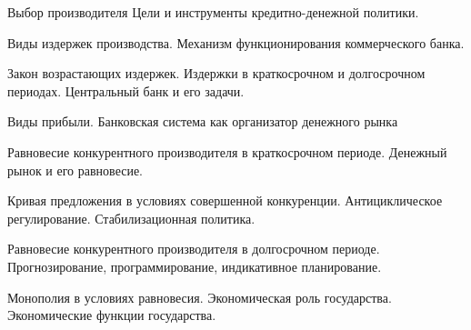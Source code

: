 \z 	Выбор производителя
 \medskip
\z 	Цели и инструменты кредитно-денежной политики.
 \medskip

\newpage


\shapkFull
\setcounter{zad}{0}

\z 	Виды издержек производства.
 \medskip
\z 	Механизм функционирования коммерческого банка.
 \medskip

\newpage


\shapkFull
\setcounter{zad}{0}

\z 	Закон возрастающих издержек.  Издержки в краткосрочном и долгосрочном периодах.
 \medskip
\z 	Центральный банк и его задачи.
 \medskip

\newpage


\shapkFull
\setcounter{zad}{0}

\z 	Виды прибыли.
 \medskip
\z 	Банковская система как организатор денежного рынка
 \medskip

\newpage


\shapkFull
\setcounter{zad}{0}

\z 	Равновесие конкурентного производителя в краткосрочном периоде.
 \medskip
\z 	Денежный рынок и его равновесие.
 \medskip

\newpage


\shapkFull
\setcounter{zad}{0}

\z 	Кривая предложения в условиях совершенной конкуренции.
 \medskip
\z 	Антициклическое регулирование. Стабилизационная политика.
 \medskip

\newpage


\shapkFull
\setcounter{zad}{0}

\z 	Равновесие конкурентного производителя в долгосрочном периоде.
 \medskip
\z 	Прогнозирование, программирование, индикативное планирование.
 \medskip

\newpage


\shapkFull
\setcounter{zad}{0}

\z 	Монополия в условиях равновесия.
 \medskip
\z 	Экономическая роль государства. Экономические функции государства.
 \medskip

\newpage


